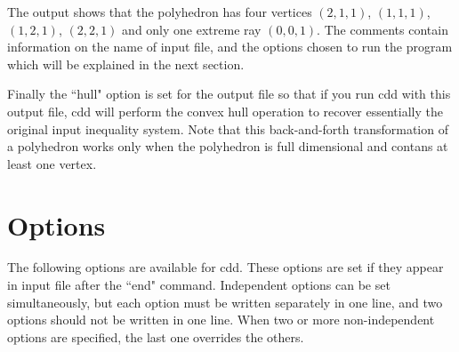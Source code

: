 The output shows that the polyhedron has four vertices
$(2,1,1)$, $(1,1,1)$, $(1,2,1)$, $(2,2,1)$ and
only one extreme ray $(0,0,1)$.  The comments contain
information on the name of input file, and the options
chosen to run the program which will be explained in
the next section.  

Finally the ``hull" option is  set for
the output file so that if you run cdd with this output file,
cdd will perform the convex hull operation to recover 
essentially the original input inequality system.  Note that
this back-and-forth transformation of a polyhedron works
only when the polyhedron is full dimensional and contans
at least one vertex.

\section{Options}  \label{OPTIONS}

The following options are available for cdd.  These options are
set if they appear in input file after the ``end" command.
Independent options can be set simultaneously, but each option
must be written separately in one line, and  two options
should not be written in one line.  When two or more non-independent
options are specified, the last one overrides the others.

